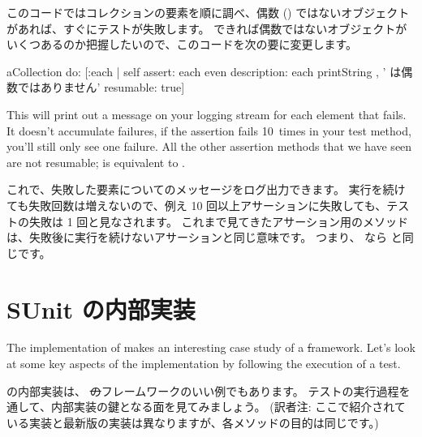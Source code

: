 \documentclass[a4paper,10pt,twoside]{book}
\begin{document}
このコードではコレクションの要素を順に調べ、偶数 () ではないオブジェクトがあれば、すぐにテストが失敗します。
できれば偶数ではないオブジェクトがいくつあるのか把握したいので、このコードを次の要に変更します。

\begin{code}{}
aCollection do:
	[:each |
	self
		assert: each even
		description: each printString , ' は偶数ではありません'
		resumable: true]
\end{code}

This will print out a message on your logging stream for each element
that fails.  It doesn't accumulate failures, \ie if the assertion
fails 10~times in your test method, you'll still only see one failure.
All the other assertion methods that we have seen are not resumable;
 is equivalent to .
\fi

これで、失敗した要素についてのメッセージをログ出力できます。
実行を続けても失敗回数は増えないので、例え 10 回以上アサーションに失敗しても、テストの失敗は 1 回と見なされます。
これまで見てきたアサーション用のメソッドは、失敗後に実行を続けないアサーションと同じ意味です。
つまり、  なら  と同じです。

\section{SUnit の内部実装}

The implementation of \sunit makes an interesting case study of a \st framework.
Let's look at some key aspects of the implementation by following the
execution of a test.
\fi

\sunit の内部実装は、 \st のフレームワークのいい例でもあります。
テストの実行過程を通して、内部実装の鍵となる面を見てみましょう。
(訳者注: ここで紹介されている実装と最新版の実装は異なりますが、各メソッドの目的は同じです。)

\end{document}
